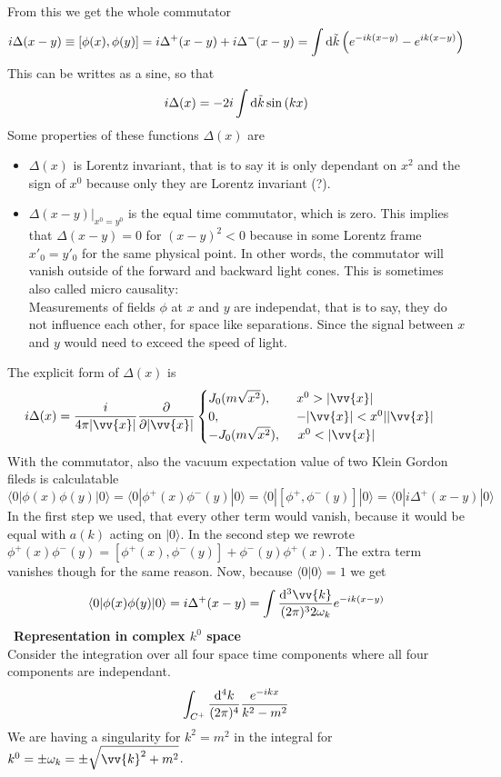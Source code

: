 \documentclass{include/thesisclass}
\newcommand{\rk}{\rangle}
\newcommand{\lk}{\langle}
\newcommand{\vx}{\vv{x}}
\newcommand{\dd}{{\rm d}}
\newcommand{\p}{\partial}
\newcommand{\sub}[1]{~\newline\newline\textbf{#1}\\}
\begin{document}
From this we get the whole commutator
\[ i \Delta(x-y) \equiv [ \phi(x), \phi(y)] = i \Delta^+(x-y) + i \Delta^-(x-y) = \int \dd\tilde{k} \left( e^{-ik(x-y)} - e^{ik(x-y)}\right)\]
This can be writtes as a sine, so that
\[ i\Delta(x) = -2 i\int \dd\tilde{k} \sin\left( k x\right)\]
Some properties of these functions $\Delta(x)$ are
\begin{itemize}
\item $\Delta(x)$ is Lorentz invariant, that is to say it is only dependant on $x^2$ and the sign of $x^0$ because only they are Lorentz invariant (?).
\item $\Delta(x-y)|_{x^0 = y^0}$ is the equal time commutator, which is zero. This implies that $\Delta(x-y) = 0$ for $(x-y)^2 <0$ because in some Lorentz frame $x'_0 = y'_0$ for the same physical point. In other words, the commutator will vanish outside of the forward and backward light cones. This is sometimes also called micro causality:\\
Measurements of fields $\phi$ at $x$ and $y$ are independat, that is to say, they do not influence each other, for space like separations. Since the signal between $x$ and $y$ would need to exceed the speed of light.
\end{itemize}
The explicit form of $\Delta(x)$ is
\[ i \Delta(x) = \frac{i}{4 \pi | \vx|} \frac{\p}{\p | \vx|} \begin{cases}
J_0 (m \sqrt{x^2}), ~~~~~~ x^0 > |\vx|\\
0 ,~~~~~~~~~~~~~~~~~~ - | \vx| < x^0 | |\vx| \\
-J_0(m\sqrt{x^2}), ~~~~ x^0 < |\vx|
\end{cases}
\]
With the commutator, also the vacuum expectation value of two Klein Gordon fileds is calculatable
\[ \lk 0 | \phi(x) \phi(y) | 0 \rk = \lk 0 | \phi^+(x) \phi^-(y) | 0 \rk = \lk 0 | [\phi^+, \phi^-(y)] | 0\rk = \lk 0 | i \Delta^+(x-y) | 0  \rk \]
In the first step we used, that every other term would vanish, because it would be equal with $a(k)$ acting on $|0\rk$. In the second step we rewrote $\phi^+(x) \phi^-(y) = [\phi^+(x), \phi^-(y)] + \phi^-(y)\phi^+(x)$. The extra term vanishes though for the same reason. Now, because $\lk 0 | 0 \rk = 1$ we get
\[ \lk 0 | \phi(x) \phi(y) | 0 \rk = i \Delta^+ (x-y) = \int \frac{ \dd^3 \vv{k}}{(2\pi)^3 2 \omega_k} e^{-ik(x-y)}\]
\sub{Representation in complex $k^0$ space}
Consider the integration over all four space time components where all four components are independant. 
\[ \int_{C^+} \frac{\dd^4 k}{(2\pi)^4} \frac{e^{-ikx}}{k^2-m^2}\]
We are having a singularity for $k^2 = m^2$ in the integral for $k^0 = \pm \omega_k = \pm \sqrt{\vv{k}^2 +m^2}$. 
\end{document}
